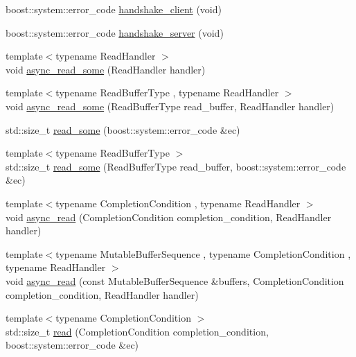\begin{DoxyCompactItemize}
boost\-::system\-::error\-\_\-code \hyperlink{classpion_1_1tcp_1_1connection_a09709b4bbd1a43d5902a8df0b4137f2f}{handshake\-\_\-client} (void)
\item 
boost\-::system\-::error\-\_\-code \hyperlink{classpion_1_1tcp_1_1connection_ad9306a425d685f91f6465ec8d5617931}{handshake\-\_\-server} (void)
\item 
{\footnotesize template$<$typename Read\-Handler $>$ }\\void \hyperlink{classpion_1_1tcp_1_1connection_a60d567fd754237b5bfb00004f489435f}{async\-\_\-read\-\_\-some} (Read\-Handler handler)
\item 
{\footnotesize template$<$typename Read\-Buffer\-Type , typename Read\-Handler $>$ }\\void \hyperlink{classpion_1_1tcp_1_1connection_a204ad77a69609adc435baecf29c7625e}{async\-\_\-read\-\_\-some} (Read\-Buffer\-Type read\-\_\-buffer, Read\-Handler handler)
\item 
std\-::size\-\_\-t \hyperlink{classpion_1_1tcp_1_1connection_af3c5c14c87e99bd40b605b0fb0b4a84e}{read\-\_\-some} (boost\-::system\-::error\-\_\-code \&ec)
\item 
{\footnotesize template$<$typename Read\-Buffer\-Type $>$ }\\std\-::size\-\_\-t \hyperlink{classpion_1_1tcp_1_1connection_ab0529db5feb721f55adaf8d23e6cc9c9}{read\-\_\-some} (Read\-Buffer\-Type read\-\_\-buffer, boost\-::system\-::error\-\_\-code \&ec)
\item 
{\footnotesize template$<$typename Completion\-Condition , typename Read\-Handler $>$ }\\void \hyperlink{classpion_1_1tcp_1_1connection_a6eaaee791d1093a59258b3082ef7aa60}{async\-\_\-read} (Completion\-Condition completion\-\_\-condition, Read\-Handler handler)
\item 
{\footnotesize template$<$typename Mutable\-Buffer\-Sequence , typename Completion\-Condition , typename Read\-Handler $>$ }\\void \hyperlink{classpion_1_1tcp_1_1connection_ad63926d47b0cd29b391bd8c7130719f4}{async\-\_\-read} (const Mutable\-Buffer\-Sequence \&buffers, Completion\-Condition completion\-\_\-condition, Read\-Handler handler)
\item 
{\footnotesize template$<$typename Completion\-Condition $>$ }\\std\-::size\-\_\-t \hyperlink{classpion_1_1tcp_1_1connection_aa444b18b7bc1ad8735ce021e45a3299f}{read} (Completion\-Condition completion\-\_\-condition, boost\-::system\-::error\-\_\-code \&ec)

\end{DoxyCompactItemize}
